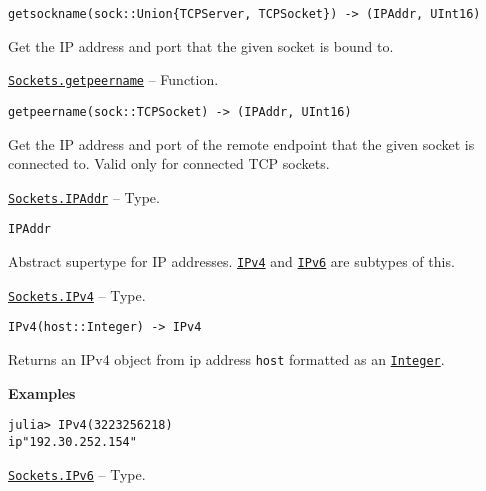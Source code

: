 \begin{adjustwidth}{2em}{0pt}


\begin{verbatim}
getsockname(sock::Union{TCPServer, TCPSocket}) -> (IPAddr, UInt16)
\end{verbatim}

Get the IP address and port that the given socket is bound to.



\end{adjustwidth}
\hypertarget{3342627656847235889}{}
\hyperlink{3342627656847235889}{\texttt{Sockets.getpeername}}  -- {Function.}

\begin{adjustwidth}{2em}{0pt}


\begin{verbatim}
getpeername(sock::TCPSocket) -> (IPAddr, UInt16)
\end{verbatim}

Get the IP address and port of the remote endpoint that the given socket is connected to. Valid only for connected TCP sockets.



\end{adjustwidth}
\hypertarget{8098410990676145612}{}
\hyperlink{8098410990676145612}{\texttt{Sockets.IPAddr}}  -- {Type.}

\begin{adjustwidth}{2em}{0pt}


\begin{verbatim}
IPAddr
\end{verbatim}

Abstract supertype for IP addresses. \hyperlink{3367105148999996858}{\texttt{IPv4}} and \hyperlink{14863381148391509384}{\texttt{IPv6}} are subtypes of this.



\end{adjustwidth}
\hypertarget{3367105148999996858}{}
\hyperlink{3367105148999996858}{\texttt{Sockets.IPv4}}  -- {Type.}

\begin{adjustwidth}{2em}{0pt}


\begin{verbatim}
IPv4(host::Integer) -> IPv4
\end{verbatim}

Returns an IPv4 object from ip address \texttt{host} formatted as an \hyperlink{8469131683393450448}{\texttt{Integer}}.

\textbf{Examples}


\begin{verbatim}
julia> IPv4(3223256218)
ip"192.30.252.154"
\end{verbatim}



\end{adjustwidth}
\hypertarget{14863381148391509384}{}
\hyperlink{14863381148391509384}{\texttt{Sockets.IPv6}}  -- {Type.}

